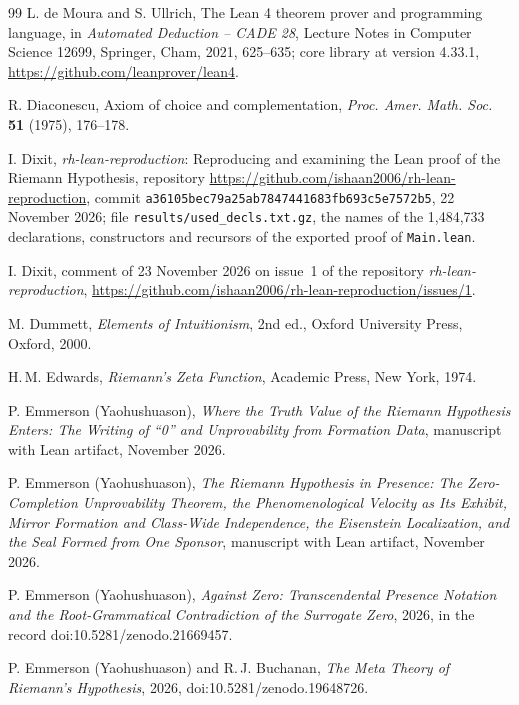\documentclass[11pt]{article}
\theoremstyle{definition}
\theoremstyle{remark}
\DeclareRobustCommand{\lean}[1]{{\renewcommand{\_}{\textunderscore\allowbreak}\texttt{#1}}}
\begin{document}
\begin{thebibliography}{99}
 L. de Moura and S. Ullrich, The Lean 4 theorem prover and programming language, in \emph{Automated Deduction -- CADE 28}, Lecture Notes in Computer Science 12699, Springer, Cham, 2021, 625--635; core library at version 4.33.1, \url{https://github.com/leanprover/lean4}.

 R. Diaconescu, Axiom of choice and complementation, \emph{Proc. Amer. Math. Soc.} \textbf{51} (1975), 176--178.

 I. Dixit, \emph{rh-lean-reproduction}: Reproducing and examining the Lean proof of the Riemann Hypothesis, repository \url{https://github.com/ishaan2006/rh-lean-reproduction}, commit \nolinkurl{a36105bec79a25ab7847441683fb693c5e7572b5}, 22 November 2026; file \nolinkurl{results/used_decls.txt.gz}, the names of the 1{,}484{,}733 declarations, constructors and recursors of the exported proof of \lean{Main.lean}.

 I. Dixit, comment of 23 November 2026 on issue~1 of the repository \emph{rh-lean-reproduction}, \url{https://github.com/ishaan2006/rh-lean-reproduction/issues/1}.

 M. Dummett, \emph{Elements of Intuitionism}, 2nd ed., Oxford University Press, Oxford, 2000.

 H.\,M. Edwards, \emph{Riemann's Zeta Function}, Academic Press, New York, 1974.

 P. Emmerson (Yaohushuason), \emph{Where the Truth Value of the Riemann Hypothesis Enters: The Writing of ``0'' and Unprovability from Formation Data}, manuscript with Lean artifact, November 2026.

 P. Emmerson (Yaohushuason), \emph{The Riemann Hypothesis in Presence: The Zero-Completion Unprovability Theorem, the Phenomenological Velocity as Its Exhibit, Mirror Formation and Class-Wide Independence, the Eisenstein Localization, and the Seal Formed from One Sponsor}, manuscript with Lean artifact, November 2026.

 P. Emmerson (Yaohushuason), \emph{Against Zero: Transcendental Presence Notation and the Root-Grammatical Contradiction of the Surrogate Zero}, 2026, in the record doi:10.5281/zenodo.21669457.

 P. Emmerson (Yaohushuason) and R.\,J. Buchanan, \emph{The Meta Theory of Riemann's Hypothesis}, 2026, doi:10.5281/zenodo.19648726.


\end{thebibliography}
\end{document}
